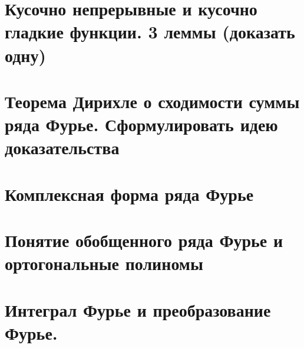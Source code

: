 \documentclass[11pt]{article}
\begin{document}
\section{ Кусочно непрерывные и кусочно гладкие функции. 3 леммы (доказать одну)}

\section{Теорема Дирихле о сходимости суммы ряда Фурье. Сформулировать идею доказательства}

\section{Комплексная форма ряда Фурье}

\section{Понятие обобщенного ряда Фурье и ортогональные полиномы}

\section{Интеграл Фурье и преобразование Фурье.}

\end{document}
